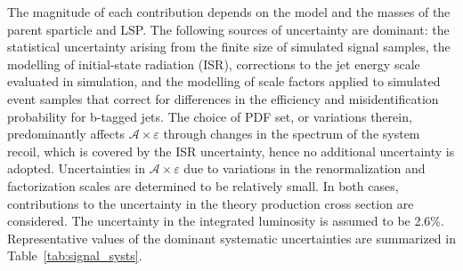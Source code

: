 The magnitude of each contribution depends on the model and the masses
of the parent sparticle and LSP. The following sources of uncertainty
are dominant: the statistical uncertainty arising from the finite size
of simulated signal samples, the modelling of initial-state radiation
(ISR), corrections to the jet energy scale evaluated in simulation,
and the modelling of scale factors applied to simulated event samples
that correct for differences in the efficiency and misidentification
probability for b-tagged jets. The choice of PDF set, or variations
therein, predominantly affects $\mathcal{A}\times\varepsilon$ through
changes in the \pt spectrum of the system recoil, which is covered by
the ISR uncertainty, hence no additional uncertainty is
adopted. Uncertainties in $\mathcal{A}\times\varepsilon$ due to
variations in the renormalization and factorization scales are
determined to be relatively small. In both cases, contributions to the
uncertainty in the theory production cross section are considered. The
uncertainty in the integrated luminosity is assumed to be
2.6\%. Representative values of the dominant systematic uncertainties
are summarized in Table~\ref{tab:signal_systs}.

